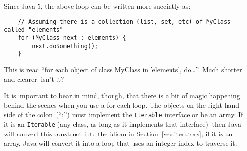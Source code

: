 Since Java 5, the above loop can be written more succintly as: 

\begin{verbatim}
    // Assuming there is a collection (list, set, etc) of MyClass called "elements"
    for (MyClass next : elements) {
        next.doSomething();
    }    
\end{verbatim}

This is read ``for each object of class MyClass in 'elements',
do\ldots''. Much shorter and clearer, isn't it? 

It is important to bear in mind, though,
that there is a bit of magic happening behind the scenes when you use
a for-each loop. The objects on the right-hand side of the
colon~(``:'') must implement the \verb+Iterable+ interface or be an
array. If it is an \verb+Iterable+ (any class, as long as it
implements that interface), then Java will convert this construct into
the idiom in Section~\ref{sec:iterators}; 
if it is an array, Java will convert it into a loop
that uses an integer index to traverse it. 




